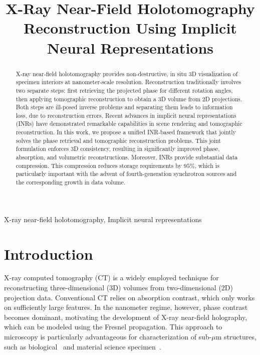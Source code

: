 \documentclass{article}
\title{X-Ray Near-Field Holotomography Reconstruction Using Implicit Neural Representations}
\begin{document}
\ninept
\frenchspacing
%
\maketitle
%
\begin{abstract}
	X-ray near-field holotomography provides non-destructive, in situ 3D visualization of specimen interiors at nanometer-scale resolution.
Reconstruction traditionally involves two separate steps: first retrieving the projected phase for different rotation angles, then applying tomographic reconstruction to obtain a 3D volume from 2D projections.
Both steps are ill-posed inverse problems and separating them leads to information loss, due to reconstruction errors.
Recent advances in implicit neural representations (INRs) have demonstrated remarkable capabilities in scene rendering and tomographic reconstruction.
In this work, we propose a unified INR-based framework that jointly solves the phase retrieval and tomographic reconstruction problems.
This joint formulation enforces 3D consistency, resulting in significantly improved phase, absorption, and volumetric reconstructions.
Moreover, INRs provide substantial data compression.
This compression reduces storage requirements by $95\%$, which is particularly important with the advent of fourth-generation synchrotron sources and the corresponding growth in data volume.
\end{abstract}
%
\begin{keywords}
X-ray near-field holotomography, Implicit neural representations
\end{keywords}
%
\section{Introduction}
\label{sec:intro}
X-ray computed tomography (CT) is a widely employed technique for reconstructing three-dimensional (3D) volumes from two-dimensional (2D) projection data.
Conventional CT relies on absorption contrast, which only works on sufficiently large features. 
In the nanometer regime, however, phase contrast becomes dominant, motivating the development of X-ray near-field holography, which can be modeled using the Fresnel propagation.
This approach to microscopy is particularly advantageous for characterization of sub-$\mu$m structures, such as biological~\cite{vesely3DXrayNanotomography2021a,flennerHardXrayNanoholotomography2020b,gerhardtThreedimensionalArchitectureLinearized2025} and material science specimen~\cite{reimersDevelopmentBioreactorCoupledFlowCell2023}.
\end{document}
